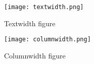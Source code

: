 \documentclass[letterpaper, 10pt, twocolumn]{article}
\begin{document}
\begin{figure*}[hp]
\centering
\texttt{[image: textwidth.png]}
\caption{Textwidth figure}
\end{figure*}

\begin{figure}[hp]
\centering
\texttt{[image: columnwidth.png]}
\caption{Columnwidth figure}
\end{figure}
\end{document}
